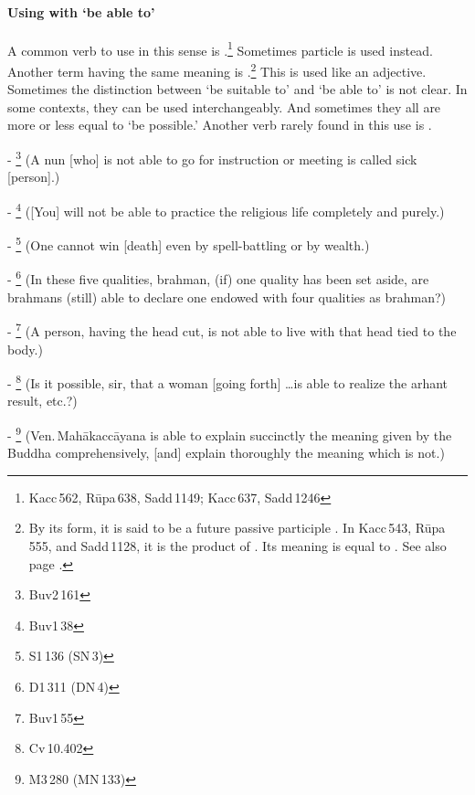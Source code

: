 \paragraph*{Using with `be able to'} A common verb to use in this sense is .\footnote{Kacc\,562, R\=upa\,638, Sadd\,1149; Kacc\,637, Sadd\,1246} Sometimes particle  is used instead. Another term having the same meaning is .\footnote{By its form, it is said to be a future passive participle \citep[p.~111]{collins:grammar}. In Kacc\,543, R\=upa\,555, and Sadd\,1128, it is the product of . Its meaning is equal to . See also page \pageref{pacck3:dnya}.} This is used like an adjective. Sometimes the distinction between `be suitable to' and `be able to' is not clear. In some contexts, they can be used interchangeably. And sometimes they all are more or less equal to `be possible.' Another verb rarely found in this use is .\par
- \footnote{Buv2\,161} (A nun [who] is not able to go for instruction or meeting is called sick [person].)\par
- \footnote{Buv1\,38} ([You] will not be able to practice the religious life completely and purely.)\par
- \footnote{S1\,136 (SN\,3)} (One cannot win [death] even by spell-battling or by wealth.)\par
- \footnote{D1\,311 (DN\,4)} (In these five qualities, brahman, (if) one quality has been set aside, are brahmans (still) able to declare one endowed with four qualities as brahman?)\par
- \footnote{Buv1\,55} (A person, having the head cut, is not able to live with that head tied to the body.)\par
- \footnote{Cv\,10.402} (Is it possible, sir, that a woman [going forth] \ldots is able to realize the arhant result, etc.?)\par
- \footnote{M3\,280 (MN\,133)} (Ven.\,Mah\=akacc\=ayana is able to explain succinctly the meaning given by the Buddha comprehensively, [and] explain thoroughly the meaning which is not.)\par

